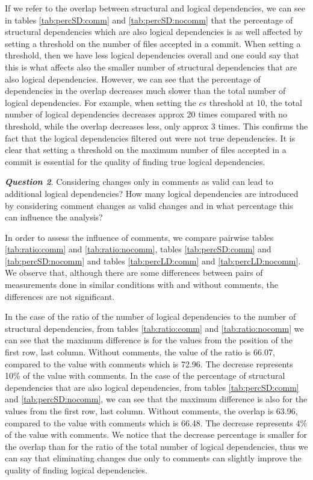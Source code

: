 \documentclass[a4paper,twoside]{article}
\begin{document}
If we refer to the overlap between structural and logical dependencies, we can see in tables \ref{tab:percSD:comm} and \ref{tab:percSD:nocomm} that the percentage of structural dependencies which are also logical dependencies is as well affected by setting a threshold on the number of files accepted in a commit. When setting a threshold, then we have less logical dependencies overall and one could say that this is what affects also the smaller number of structural dependencies that are also logical dependencies. However, we can see that the percentage of dependencies in the overlap decreases much slower than the total number of logical dependencies. For example, when setting  the $cs$ threshold at 10, the total number of logical dependencies decreases approx 20 times compared with no threshold, while the overlap decreases less, only approx 3 times. This confirms the fact that the logical dependencies filtered out were not true dependencies. It is clear that setting a threshold on the maximum number of files accepted in a commit is essential for the quality of finding true logical dependencies.


\textit{\textbf{Question 2}}. Considering changes only in comments as valid can lead to additional logical dependencies? How many logical dependencies are introduced by considering comment changes as valid changes and in what percentage this can influence the analysis?

In order to assess the influence of comments, we compare pairwise tables \ref{tab:ratio:comm} and \ref{tab:ratio:nocomm},  
tables \ref{tab:percSD:comm} and \ref{tab:percSD:nocomm} and tables \ref{tab:percLD:comm} and \ref{tab:percLD:nocomm}. 
We observe that, although there are some differences between pairs of measurements done in similar conditions with and without comments, the differences are not significant.

In the case of the ratio of the number of logical dependencies to the number of structural dependencies, from tables \ref{tab:ratio:comm} and \ref{tab:ratio:nocomm} we can see that the maximum difference is for the values from the position of the first row, last column. Without comments, the value of the ratio is 66.07, compared to the value with comments which is 72.96. The decrease represents 10\% of the value with comments. In the case of the percentage of structural dependencies that are also logical dependencies, from tables \ref{tab:percSD:comm} and \ref{tab:percSD:nocomm}, we can see that the maximum difference is also for the values from the first row, last column. Without comments, the overlap is 63.96, compared to the value with comments which is 66.48.  The decrease represents 4\% of the value with comments. We notice that the decrease percentage is smaller for the overlap than for the ratio of the total number of logical dependencies, thus we can say that eliminating changes due only to comments can slightly improve the quality of finding logical dependencies. 
\end{document}
